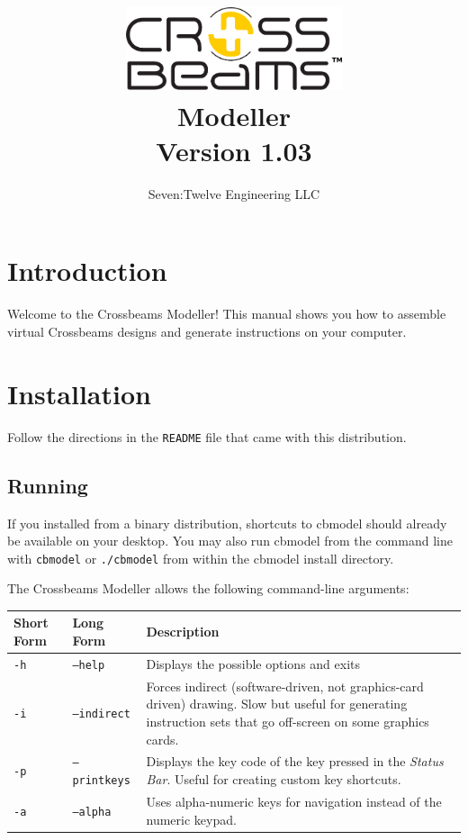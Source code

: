 \documentclass[12pt]{report}
\newcommand{\version}{1.03} %
\begin{document}

\title{\includegraphics[width=2.5in]{logo_black.png}\\\vspace{0.5in}Modeller\\Version \version}
\author{Seven:Twelve Engineering LLC}
\date{}
\maketitle

\clearpage

\section{Introduction}

Welcome to the Crossbeams Modeller!  This manual shows you how to
assemble virtual Crossbeams designs and generate instructions on your
computer.

\section{Installation}

Follow the directions in the {\tt README} file that came with this
distribution.

\subsection{Running}

If you installed from a binary distribution, shortcuts to cbmodel
should already be available on your desktop.  You may also run cbmodel
from the command line with {\tt cbmodel} or {\tt ./cbmodel} from
within the cbmodel install directory.

The Crossbeams Modeller allows the following command-line arguments:

\begin{center}
\begin{tabular}{llp{3in}}
Short Form & Long Form & Description\\
\hline
{\tt -h} & {\tt --help} & Displays the possible options and exits\\
{\tt -i} & {\tt --indirect} & Forces indirect (software-driven, not graphics-card driven) drawing.  Slow but useful for generating instruction sets that go off-screen on some graphics cards.\\
{\tt -p} & {\tt --printkeys} & Displays the key code of the key pressed in the \emph{Status Bar}.  Useful for creating custom key shortcuts.\\
{\tt -a} & {\tt --alpha} & Uses alpha-numeric keys for navigation instead of the numeric keypad.
\end{tabular}
\end{center}
\end{document}
